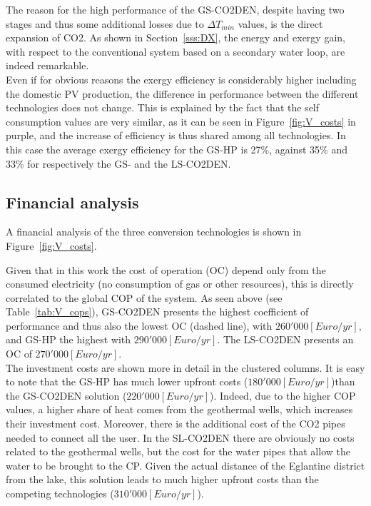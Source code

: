 \documentclass{article}
\begin{document}


The reason for the high performance of the GS-CO2DEN, despite having two stages and thus some additional losses due to $\Delta T_{min}$ values, is the direct expansion of CO2. As shown in Section~\ref{sss:DX}, the energy and exergy gain, with respect to the conventional system based on a secondary water loop, are indeed remarkable.\\

Even if for obvious reasons the exergy efficiency is considerably higher including the domestic PV production, the difference in performance between the different technologies does not change. This is explained by the fact that the self consumption values are very similar, as it can be seen in Figure~\ref{fig:V_costs} in purple, and the increase of efficiency is thus shared among all technologies. In this case the average exergy efficiency for the GS-HP is 27\%, against 35\% and 33\% for respectively the GS- and the LS-CO2DEN.


\subsection{Financial analysis}

A financial analysis of the three conversion technologies is shown in Figure~\ref{fig:V_costs}. 

Given that in this work the cost of operation (OC) depend only from the consumed electricity (no consumption of gas or other resources), this is directly correlated to the global COP of the system. As seen above (see Table~\ref{tab:V_cops}), GS-CO2DEN presents the highest coefficient of performance and thus also the lowest OC (dashed line), with $260'000[Euro/yr]$, and GS-HP the highest with $290'000[Euro/yr]$. The LS-CO2DEN presents an OC of $270'000[Euro/yr]$.\\

The investment costs are shown more in detail in the clustered columns. It is easy to note that the GS-HP has much lower upfront costs ($180'000[Euro/yr]$)than the GS-CO2DEN solution ($220'000[Euro/yr]$). Indeed, due to the higher COP values, a higher share of heat comes from the geothermal wells, which increases their investment cost. Moreover, there is the additional cost of the CO2 pipes needed to connect all the user. In the SL-CO2DEN there are obviously no costs related to the geothermal wells, but the cost for the water pipes that allow the water to be brought to the CP. Given the actual distance of the Eglantine district from the lake, this solution leads to much higher upfront costs than the competing technologies ($310'000[Euro/yr]$).\\
\end{document}
